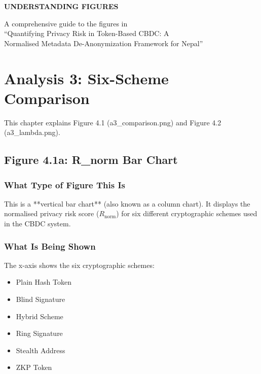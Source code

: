 \documentclass[12pt,a4paper,oneside,openany]{report}
\begin{document}
\begin{titlepage}
\centering
\vspace*{3cm}

{\Large\textbf{UNDERSTANDING FIGURES}}

\vspace{2cm}

{\normalsize A comprehensive guide to the figures in}
\\
{\normalsize ``Quantifying Privacy Risk in Token-Based CBDC: A}
\\
{\normalsize Normalised Metadata De-Anonymization Framework for Nepal''}

\vspace{3cm}

\end{titlepage}

\chapter{Analysis 3: Six-Scheme Comparison}
\label{chap:a3}

This chapter explains Figure 4.1 (a3\_comparison.png) and Figure 4.2 (a3\_lambda.png).

\section{Figure 4.1a: R\_norm Bar Chart}
\label{sec:f4.1a}

\subsection{What Type of Figure This Is}
This is a **vertical bar chart** (also known as a column chart). It displays the normalised privacy risk score ($R_{\mathrm{norm}}$) for six different cryptographic schemes used in the CBDC system.

\subsection{What Is Being Shown}
The x-axis shows the six cryptographic schemes:
\begin{itemize}
    \item Plain Hash Token
    \item Blind Signature
    \item Hybrid Scheme
    \item Ring Signature
    \item Stealth Address
    \item ZKP Token
\end{itemize}
\end{document}
